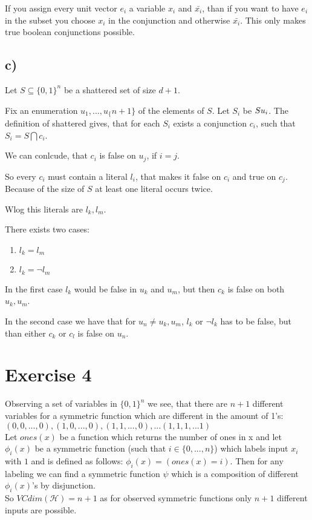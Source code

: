 \documentclass{article}
\begin{document}
If you assign every unit vector $e_i$ a variable $x_i$ and $\bar{x_i}$, than if
you want to have $e_i$ in the subset you choose $x_i$ in the conjunction and
otherwise $\bar{x_i}$. This only makes true boolean conjunctions possible. 

\subsection*{c)}
Let $S\subseteq \{0,1\} ^ n$ be a shattered set of size $d+1$. 

Fix an enumeration $u_1,\ldots,u_\{n+1\}$ of the elements of $S$. Let $S_i$ be
$S\\ u_i$. The definition of shattered gives, that for each $S_i$ exists a
conjunction $c_i$, such that $S_i = S\bigcap c_i$.

We can conlcude, that $c_i$ is false on $u_j$, if $i=j$.

So every $c_i$ must contain a literal $l_i$, that makes it false on $c_i$ and
true on $c_j$. Because of the size of $S$ at least one literal occurs twice.

Wlog this literals are $l_k,l_m$. 

There exists two cases:
\begin{enumerate}
  \item $l_k=l_m$\\
  \item $l_k=\neg l_m$
\end{enumerate}
In the first case $l_k$ would be false in $u_k$ and $u_m$, but then $c_k$ is
false on both $u_k,u_m$.

In the second case we have that for $u_n\neq u_k,u_m$, $l_k \text{ or }\neg l_k$
has to be false, but than either $c_k \text{ or } c_l$ is false on $u_n$.


\section*{Exercise 4}
Observing a set of variables in $\{0,1\}^n$ we see, that there are $n+1$ different variables for a symmetric function which are different in the amount of 1's: \\ ${(0,0,..., 0), (1,0,..., 0), (1,1,..., 0), ... (1,1,1, ... 1)}$ \\
Let $ones(x)$ be a function which returns the number of ones in x and let $\phi_i(x)$ be a symmetric function (such that $i\in\{0,..., n\}$) which labels input $x_i$ with $1$ and is defined as follows:
$\phi_i(x) = (ones(x) = i)$.
Then for any labeling we can find a symmetric function $\psi$ which is a composition of different  $\phi_i(x)$'s by disjunction. \\
So $VCdim(\mathcal{H}) = n+1$ as for observed symmetric functions only $n+1$ different inputs are possible.
\end{document}

